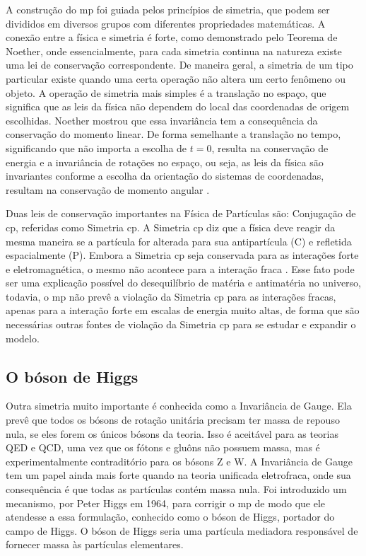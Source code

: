 A construção do \gls{mp} foi guiada pelos princípios 
de simetria, que podem ser divididos em diversos grupos com diferentes
propriedades matemáticas. A conexão entre a física e simetria é forte, como
demonstrado pelo Teorema de Noether, onde essencialmente, para cada simetria
continua na natureza existe uma lei de conservação correspondente. De maneira
geral, a simetria de um tipo particular existe quando uma certa operação não
altera um certo fenômeno ou objeto. A operação de simetria mais simples é a
translação no espaço, que significa que as leis da física não dependem do local
das coordenadas de origem escolhidas. Noether mostrou que essa invariância tem a
consequência da conservação do momento linear. De forma semelhante a translação
no tempo, significando que não importa a escolha de $t = 0$, resulta na
conservação de energia e a invariância de rotações no espaço, ou seja, as leis
da física são invariantes conforme a escolha da orientação do sistemas de
coordenadas, resultam na conservação de momento angular
\cite{Intro_Standard,Feynman}.

Duas leis de conservação importantes na Física de
Partículas são: Conjugação de \gls{cp}, referidas como Simetria \gls{cp}. 
A Simetria \gls{cp} diz que a física deve reagir
da mesma maneira se a partícula for alterada para sua antipartícula (C) e refletida
espacialmente (P).
Embora a Simetria \gls{cp} seja conservada para as interações forte
e eletromagnética, o mesmo não acontece para a interação fraca
\cite{Intro_Nuclear}. Esse fato pode ser uma explicação possível do
desequilíbrio de matéria e antimatéria no universo, todavia, o \gls{mp} não
prevê a violação da Simetria \gls{cp} para as interações fracas, apenas para a
interação forte em escalas de energia muito altas, de forma que são necessárias
outras fontes de violação da Simetria \gls{cp} para se estudar e expandir o modelo.
 
\subsection{O bóson de Higgs}
\label{ssec:higgs}

Outra simetria muito importante é conhecida como a Invariância de Gauge.
Ela prevê que todos os bósons de rotação unitária precisam ter
massa de repouso nula, se eles forem os únicos bósons da teoria.
Isso é aceitável para as teorias QED e QCD, uma vez que os
fótons e gluôns não possuem massa, mas é experimentalmente contraditório
para os bósons Z e W. A Invariância de Gauge tem um papel ainda mais forte
quando na teoria unificada eletrofraca, onde sua consequência é que todas as
partículas contém massa nula. Foi introduzido um mecanismo, 
por Peter Higgs em 1964, para corrigir o \gls{mp} de modo que ele atendesse
a essa formulação, conhecido como o bóson de Higgs, portador do campo de Higgs. O bóson de Higgs seria
uma partícula mediadora responsável de fornecer massa às partículas elementares.

